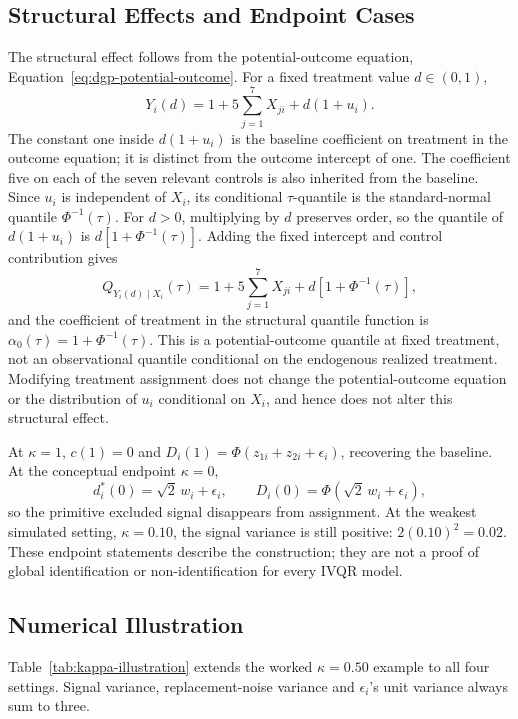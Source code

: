 \subsection{Structural Effects and Endpoint Cases}

The structural effect follows from the potential-outcome equation, Equation~\eqref{eq:dgp-potential-outcome}. For a fixed treatment value $d\in(0,1)$,
\[
 Y_i(d)=1+5\sum_{j=1}^{7}X_{ji}+d(1+u_i).
\]
The constant one inside $d(1+u_i)$ is the baseline coefficient on treatment in the outcome equation; it is distinct from the outcome intercept of one. The coefficient five on each of the seven relevant controls is also inherited from the baseline. Since $u_i$ is independent of $X_i$, its conditional $\tau$-quantile is the standard-normal quantile $\Phi^{-1}(\tau)$. For $d>0$, multiplying by $d$ preserves order, so the quantile of $d(1+u_i)$ is $d[1+\Phi^{-1}(\tau)]$. Adding the fixed intercept and control contribution gives
\[
 Q_{Y_i(d)\mid X_i}(\tau)
 =1+5\sum_{j=1}^{7}X_{ji}+d\left[1+\Phi^{-1}(\tau)\right],
\]
and the coefficient of treatment in the structural quantile function is $\alpha_0(\tau)=1+\Phi^{-1}(\tau)$. This is a potential-outcome quantile at fixed treatment, not an observational quantile conditional on the endogenous realized treatment. Modifying treatment assignment does not change the potential-outcome equation or the distribution of $u_i$ conditional on $X_i$, and hence does not alter this structural effect.

At $\kappa=1$, $c(1)=0$ and $D_i(1)=\Phi(z_{1i}+z_{2i}+\epsilon_i)$, recovering the baseline. At the conceptual endpoint $\kappa=0$,
\[
 d_i^*(0)=\sqrt{2}\,w_i+\epsilon_i,
 \qquad D_i(0)=\Phi(\sqrt{2}\,w_i+\epsilon_i),
\]
so the primitive excluded signal disappears from assignment. At the weakest simulated setting, $\kappa=0.10$, the signal variance is still positive: $2(0.10)^2=0.02$. These endpoint statements describe the construction; they are not a proof of global identification or non-identification for every IVQR model.

\subsection{Numerical Illustration}

Table~\ref{tab:kappa-illustration} extends the worked $\kappa=0.50$ example to all four settings. Signal variance, replacement-noise variance and $\epsilon_i$'s unit variance always sum to three.


\FloatBarrier

